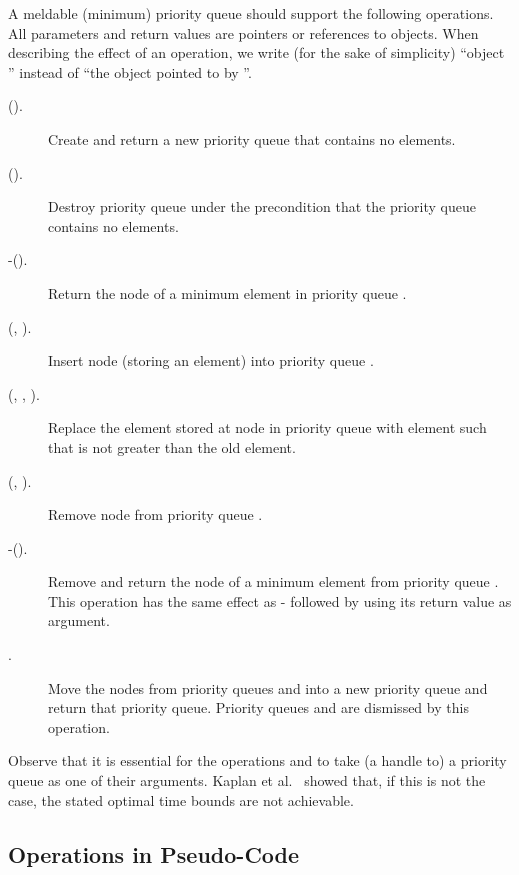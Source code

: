 \documentclass{llncs}
\newcommand{\Construct}{\mbox{}}
\newcommand{\Destroy}{\mbox{}}
\newcommand{\Findmin}{\mbox{\mbox{\rm -}}}
\newcommand{\Insert}{\mbox{}}
\newcommand{\Deletemin}{\mbox{\mbox{\rm -}}}
\newcommand{\Decrease}{\mbox{}}
\newcommand{\Delete}{\mbox{}}
\begin{document}
A meldable (minimum) priority queue should support the following operations. All
parameters and return values are pointers or references to
objects. When describing the effect of an operation, we write (for the
sake of simplicity) ``object '' instead of ``the object pointed to
by ''.
\begin{description}
\item[\Construct{}().] Create and return a new priority queue that
  contains no elements.

\item[\Destroy{}().] Destroy priority queue  under the
  precondition that the priority queue contains no elements.

\item[\Findmin{}().] Return the node of a minimum
  element in priority queue .

\item[\Insert{}(, ).] Insert node  (storing an
  element) into priority queue .

\item[\Decrease{}(, , ).] Replace the element
  stored at node  in priority queue  with element  such
  that  is not greater than the old element.

\item[\Delete{}(, ).]  Remove node  from priority queue .

\item[\Deletemin{}().] Remove and return the node of a minimum
  element from priority queue . This operation has the same effect as
  \Findmin{} followed by \Delete{} using its return value as argument.

\item[.] Move the nodes from priority queues 
  and  into a new priority queue and return that priority queue.
  Priority queues  and  are dismissed by this operation.
\end{description}
Observe that it is essential for the operations \Decrease{} and
\Delete{} to take (a handle to) a priority queue as one of their arguments. Kaplan
et al.~\cite{KST02} showed that, if this is not the case, the stated optimal
time bounds are not achievable.

\subsection{Operations in Pseudo-Code}
\end{document}
